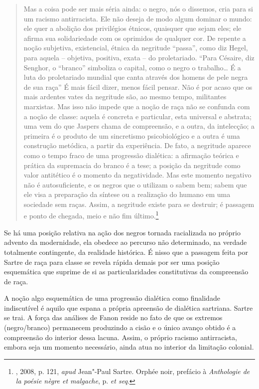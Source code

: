 \begin{quote}
Mas a coisa pode ser mais séria ainda: o negro, nós o dissemos, cria
para si um racismo antirracista. Ele não deseja de modo algum dominar o
mundo: ele quer a abolição dos privilégios étnicos, quaisquer que sejam
eles; ele afirma sua solidariedade com os oprimidos de qualquer cor. De
repente a noção subjetiva, existencial, étnica da negritude ``passa'',
como diz Hegel, para aquela -- objetiva, positiva, exata -- do
proletariado. ``Para Césaire, diz Senghor, o ``branco'' simboliza o
capital, como o negro o trabalho\ldots{} É a luta do proletariado mundial que
canta através dos homens de pele negra de sua raça'' É mais fácil
dizer, menos fácil pensar. Não é por acaso que os mais ardentes vates da
negritude são, ao mesmo tempo, militantes marxistas. Mas isso não impede
que a noção de raça não se confunda com a noção de classe: aquela é
concreta e particular, esta universal e abstrata; uma vem do que Jaspers
chama de compreensão, e a outra, da intelecção; a primeira é o produto
de um sincretismo psicobiológico e a outra é uma construção metódica, a
partir da experiência. De fato, a negritude aparece como o tempo fraco
de uma progressão dialética: a afirmação teórica e prática da supremacia
do branco é a tese; a posição da negritude como valor antitético é o
momento da negatividade. Mas este momento negativo não é
autosuficiente, e os negros que o utilizam o sabem bem; sabem que ele
visa a preparação da síntese ou a realização do humano em uma sociedade
sem raças. Assim, a negritude existe para se destruir; é passagem e
ponto de chegada, meio e não fim último.\footnote{, 2008, p. 121,
  \emph{apud} Jean"-Paul Sartre. Orphée noir, prefácio à \emph{Anthologie de la
  poésie nègre et malgache}, p.  \emph{et seq}.}
\end{quote}

Se há uma posição relativa na ação dos negros tornada racializada no
próprio advento da modernidade, ela obedece ao percurso não determinado,
na verdade totalmente contingente, da realidade histórica. É nisso que a
passagem feita por Sartre de raça para classe se revela rápida demais
por ser uma posição esquemática que suprime de si as particularidades
constitutivas da compreensão de raça.

A noção algo esquemática de uma progressão dialética como finalidade
indiscutível é aquilo que espana a própria apreensão de dialética
sartriana. Sartre se trai. A força das análises de Fanon reside no fato
de que os extremos (negro/branco) permanecem produzindo a cisão e o
único avanço obtido é a compreensão do interior dessa lacuna. Assim, o
próprio racismo antirracista, embora seja um momento necessário, ainda
atua no interior da limitação colonial.

